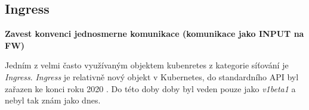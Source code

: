 
\subsection{Ingress}
\textbf{Zavest konvenci jednosmerne komunikace (komunikace jako INPUT na FW)}

Jedním z velmi často využívaným objektem kubenretes z kategorie síťování je \textit{Ingress}. \textit{Ingress} je relativně nový objekt v Kubernetes, do standardního API byl zařazen ke konci roku 2020 \cite{k8scirobot_2020_merge}. Do této doby doby byl veden pouze jako \textit{v1beta1} \cite{kashin_2021_gateway} a nebyl tak znám jako dnes.

